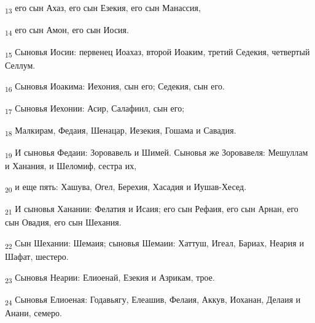 \begin{tcolorbox}
\textsubscript{13} его сын Ахаз, его сын Езекия, его сын Манассия,
\end{tcolorbox}
\begin{tcolorbox}
\textsubscript{14} его сын Амон, его сын Иосия.
\end{tcolorbox}
\begin{tcolorbox}
\textsubscript{15} Сыновья Иосии: первенец Иоахаз, второй Иоаким, третий Седекия, четвертый Селлум.
\end{tcolorbox}
\begin{tcolorbox}
\textsubscript{16} Сыновья Иоакима: Иехония, сын его; Седекия, сын его.
\end{tcolorbox}
\begin{tcolorbox}
\textsubscript{17} Сыновья Иехонии: Асир, Салафиил, сын его;
\end{tcolorbox}
\begin{tcolorbox}
\textsubscript{18} Малкирам, Федаия, Шенацар, Иезекия, Гошама и Савадия.
\end{tcolorbox}
\begin{tcolorbox}
\textsubscript{19} И сыновья Федаии: Зоровавель и Шимей. Сыновья же Зоровавеля: Мешуллам и Ханания, и Шеломиф, сестра их,
\end{tcolorbox}
\begin{tcolorbox}
\textsubscript{20} и еще пять: Хашува, Огел, Берехия, Хасадия и Иушав-Хесед.
\end{tcolorbox}
\begin{tcolorbox}
\textsubscript{21} И сыновья Ханании: Фелатия и Исаия; его сын Рефаия, его сын Арнан, его сын Овадия, его сын Шехания.
\end{tcolorbox}
\begin{tcolorbox}
\textsubscript{22} Сын Шехании: Шемаия; сыновья Шемаии: Хаттуш, Игеал, Бариах, Неария и Шафат, шестеро.
\end{tcolorbox}
\begin{tcolorbox}
\textsubscript{23} Сыновья Неарии: Елиоенай, Езекия и Азрикам, трое.
\end{tcolorbox}
\begin{tcolorbox}
\textsubscript{24} Сыновья Елиоеная: Годавьягу, Елеашив, Фелаия, Аккув, Иоханан, Делаия и Анани, семеро.
\end{tcolorbox}
